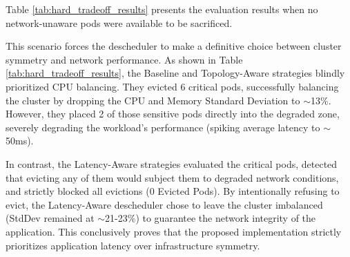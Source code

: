 Table \ref{tab:hard_tradeoff_results} presents the evaluation results when no network-unaware pods were available to be sacrificed.
\begin{table}[H]
    \centering
    \caption{Descheduler Performance: The "Hard Tradeoff" Scenario (No Network-Unaware Pods)}
    \label{tab:hard_tradeoff_results}
\end{table}

This scenario forces the descheduler to make a definitive choice between cluster symmetry and network performance. As shown in Table \ref{tab:hard_tradeoff_results}, the Baseline and Topology-Aware strategies blindly prioritized CPU balancing. They evicted 6 critical pods, successfully balancing the cluster by dropping the CPU and Memory Standard Deviation to $\sim$13\%. However, they placed 2 of those sensitive pods directly into the degraded zone, severely degrading the workload's performance (spiking average latency to $\sim$50ms).

In contrast, the Latency-Aware strategies evaluated the critical pods, detected that evicting any of them would subject them to degraded network conditions, and strictly blocked all evictions (0 Evicted Pods). By intentionally refusing to evict, the Latency-Aware descheduler chose to leave the cluster imbalanced (StdDev remained at $\sim$21-23\%) to guarantee the network integrity of the application. This conclusively proves that the proposed implementation strictly prioritizes application latency over infrastructure symmetry.

